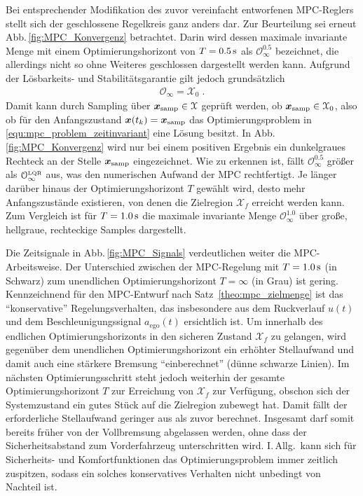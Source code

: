 Bei entsprechender Modifikation des zuvor vereinfacht entworfenen MPC-Reglers stellt sich der geschlossene Regelkreis ganz anders dar.
Zur Beurteilung sei erneut Abb.\,\ref{fig:MPC_Konvergenz} betrachtet. Darin wird dessen maximale invariante Menge mit einem Optimierungshorizont von $T=\unit[0.5]{s}$ als $\mathcal{O}_\infty^{0.5}$ bezeichnet, die allerdings nicht so ohne Weiteres geschlossen dargestellt werden kann. Aufgrund der Lösbarkeits- und Stabilitätsgarantie gilt jedoch grundsätzlich
\begin{align*}
	\mathcal O_\infty = \mathcal X_0 \;. %
\end{align*} 
Damit kann durch Sampling über $\boldsymbol{x}_\text{samp}\in \mathcal X$ geprüft werden, ob $\boldsymbol{x}_\text{samp} \in \mathcal X_0$, also ob für den Anfangszustand $\boldsymbol{x}(t_k) = \boldsymbol{x}_\text{samp}$ das Optimierungsproblem in \eqref{equ:mpc_problem_zeitinvariant} eine Lösung besitzt. In Abb.\,\ref{fig:MPC_Konvergenz} wird nur bei einem positiven Ergebnis ein dunkelgraues Rechteck an der Stelle $\boldsymbol{x}_\text{samp}$ eingezeichnet. Wie zu erkennen ist, fällt $\mathcal{O}_\infty^{0.5}$ größer als $\mathcal{O}_\infty^{\text{\tiny LQR}}$ aus, was den numerischen Aufwand der MPC rechtfertigt. Je länger darüber hinaus der Optimierungshorizont $T$ gewählt wird, desto mehr Anfangszustände existieren, von denen die Zielregion $\mathcal X_f$ erreicht werden kann. 
Zum Vergleich ist für $T=\unit[1.0]{s}$ die maximale invariante Menge $\mathcal{O}_\infty^{1.0}$ über große, hellgraue, rechteckige Samples dargestellt.

Die Zeitsignale in Abb.\,\ref{fig:MPC_Signals} verdeutlichen weiter die MPC-Arbeitsweise. Der Unterschied zwischen der MPC-Regelung mit $T=\unit[1.0]{s}$ (in Schwarz) zum unendlichen Optimierungshorizont $T=\infty$ (in Grau) ist gering. Kennzeichnend für den MPC-Entwurf nach Satz~\ref{theo:mpc_zielmenge} ist das "`konservative"' Regelungsverhalten, das insbesondere aus dem Ruckverlauf $u(t)$ und dem Beschleunigungssignal $a_\text{ego}(t)$ ersichtlich ist. Um innerhalb des endlichen Optimierungshorizonts in den sicheren Zustand $\mathcal X_f$ zu gelangen, wird gegenüber dem unendlichen Optimierungshorizont ein erhöhter Stellaufwand und damit auch eine stärkere Bremsung "`einberechnet"' (dünne schwarze Linien). Im nächsten Optimierungsschritt steht jedoch weiterhin der gesamte Optimierungshorizont $T$ zur Erreichung von $\mathcal X_f$ zur Verfügung, obschon sich der Systemzustand ein gutes Stück auf die Zielregion zubewegt hat. 
Damit fällt der erforderliche Stellaufwand geringer aus als zuvor berechnet. Insgesamt 
darf somit bereits früher von der Vollbremsung abgelassen werden, ohne dass der Sicherheitsabstand zum Vorderfahrzeug unterschritten wird. I.\,Allg.\  kann sich für Sicherheits- und Komfortfunktionen das Optimierungsproblem immer zeitlich zuspitzen, sodass ein solches konservatives Verhalten nicht unbedingt von Nachteil ist.

